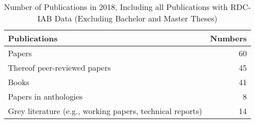 \begin{table}

    \caption{\label{tab:iabtable2}Number of Publications in 2018, Including all Publications with RDC-IAB Data (Excluding Bachelor and Master Theses)}
    \centering
    \begin{tabular}[t]{lr}
    \toprule
    Publications & Numbers\\
    \midrule
    Papers & 60\\
    Thereof peer-reviewed papers & 45\\
    Books & 41\\
    Papers in anthologies & 8\\
    Grey literature (e.g., working papers, technical reports) & 14\\
    \bottomrule
    \end{tabular}
\end{table}